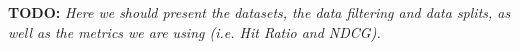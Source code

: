 \textbf{TODO: }
\textit{Here we should present the datasets, the data filtering and data splits, as well as the metrics we are using (i.e. Hit Ratio and NDCG).}
